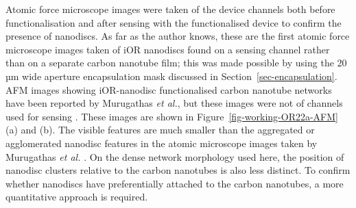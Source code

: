 \documentclass[
  a4paper,
]{scrbook}
\begin{document}
Atomic force microscope images were taken of the device channels both
before functionalisation and after sensing with the functionalised
device to confirm the presence of nanodiscs. As far as the author knows,
these are the first atomic force microscope images taken of iOR
nanodiscs found on a sensing channel rather than on a separate carbon
nanotube film; this was made possible by using the 20 µm wide aperture
encapsulation mask discussed in Section~\ref{sec-encapsulation}. AFM
images showing iOR-nanodisc functionalised carbon nanotube networks have
been reported by Murugathas \emph{et al.}, but these images were not of
channels used for sensing \autocite{Murugathas2019a}. These images are
shown in Figure~\ref{fig-working-OR22a-AFM} (a) and (b). The visible
features are much smaller than the aggregated or agglomerated nanodisc
features in the atomic microscope images taken by Murugathas \emph{et
al.} \autocite{Murugathas2019a}. On the dense network morphology used
here, the position of nanodisc clusters relative to the carbon nanotubes
is also less distinct. To confirm whether nanodiscs have preferentially
attached to the carbon nanotubes, a more quantitative approach is
required.
\end{document}
